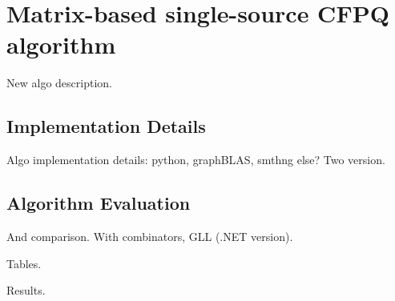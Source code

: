 \section{Matrix-based single-source CFPQ algorithm}
New algo description.

\subsection{Implementation Details}

Algo implementation details: python, graphBLAS, smthng else? Two version.

\subsection{Algorithm Evaluation}

And comparison. With combinators, GLL (.NET version).

Tables.

Results.